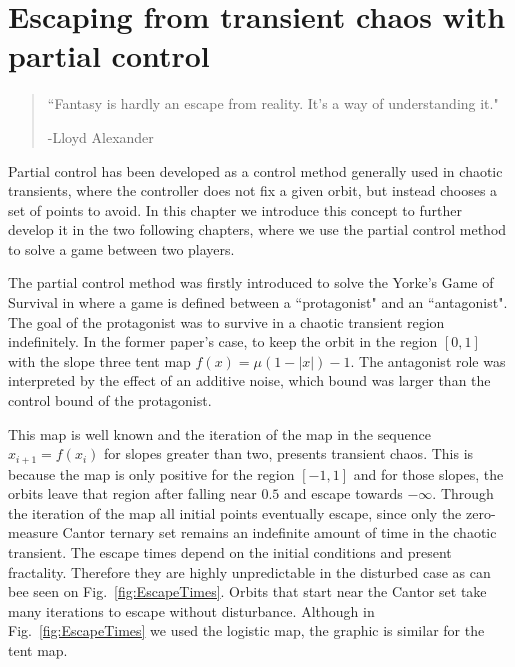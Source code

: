 \chapter{Escaping from transient chaos with partial control} %
\label{chap:ForcingEscape}


\begin{quotation}

    \begin{flushright}
    \begin{minipage}[t][5cm][b]{0.5\textwidth}
    { ``Fantasy is hardly an escape from reality. It's a way of understanding it."}
    
    \bigskip
    
    -{\small  Lloyd Alexander}
    \end{minipage}
    \end{flushright}
    
    \vspace{0.5cm}
\end{quotation}




Partial control has been developed as a control method generally used in chaotic transients, where the controller does not fix a given orbit, but instead chooses a set of points to avoid. In this chapter we introduce this concept to further develop it in the two following chapters, where we use the partial control method to solve a game between two players. 

The partial control method was firstly introduced to solve the Yorke's Game of Survival in \cite{Yorke'sGame} where a game is defined between a ``protagonist" and an ``antagonist". The goal of the protagonist was to survive in a chaotic transient region indefinitely. In the former paper's case, to keep the orbit in the region $[0,1]$ with the slope three tent map $f(x) = \mu(1-|x|)-1$. The antagonist role was interpreted by the effect of an additive noise, which bound was larger than the control bound of the protagonist.

This map is well known and the iteration of the map in the sequence $x_{i+1} = f(x_i)$ for slopes greater than two, presents transient chaos. This is because the map is only positive for the region $[-1,1]$ and for those slopes, the orbits leave that region after falling near $0.5$ and escape towards $-\infty$. Through the iteration of the map all initial points eventually escape, since only the zero-measure Cantor ternary set remains an indefinite amount of time in the chaotic transient. The escape times depend on the initial conditions and present fractality. Therefore they are highly unpredictable in the disturbed case as can bee seen on Fig.~\ref{fig:EscapeTimes}. Orbits that start near the Cantor set take many iterations to escape without disturbance. Although in Fig.~\ref{fig:EscapeTimes} we used the logistic map, the graphic is similar for the tent map.

